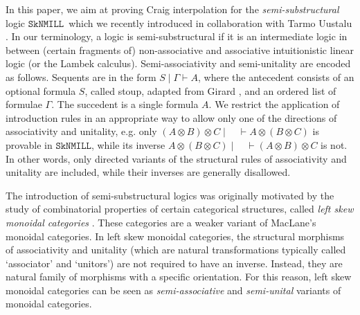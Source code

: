 \documentclass[sn-mathphys-num]{sn-jnl}%
\newcommand{\GG}{\Gamma}
\newcommand{\vd}{\vdash}
\newcommand{\ot}{\otimes}
\newcommand{\SkNMILL}{$\mathtt{SkNMILL}$}
\theoremstyle{thmstyleone}%
\theoremstyle{thmstyletwo}%
\theoremstyle{thmstylethree}%
\begin{document}
In this paper, we aim at proving Craig interpolation for the \emph{semi-substructural} logic \SkNMILL\ which we recently introduced in collaboration with Tarmo Uustalu \cite{UVW:protsn}.
In our terminology, a logic is semi-substructural if it is an intermediate logic in between (certain fragments of) non-associative and associative intuitionistic linear logic (or the Lambek calculus).
Semi-associativity and semi-unitality are encoded as follows.
Sequents are in the form $S \mid \GG \vdash A$, where the antecedent consists of an optional formula $S$, called stoup, adapted from Girard \cite{girard:constructive:91}, and an ordered list of formulae $\GG$.
The succedent is a single formula $A$.
We restrict the application of introduction rules in an appropriate way to allow only one of the directions of associativity and unitality, e.g. only $(A \ot B)\ot C \mid \quad \vd A \ot (B \ot C)$ is provable in \SkNMILL, while its inverse $A \ot (B \ot C) \mid \quad \vd (A \ot B) \ot C$ is not.
In other words, only directed variants of the structural rules of associativity and unitality are included, while their inverses are generally disallowed.

The introduction of semi-substructural logics was originally motivated by the study of combinatorial properties of certain categorical structures, called \emph{left skew monoidal categories} \cite{szlachanyi:skew-monoidal:2012}.
These categories are a weaker variant of MacLane's monoidal categories.
In left skew monoidal categories, the structural morphisms of associativity and unitality (which are natural transformations typically called `associator' and `unitors') are not required to have an inverse. Instead, they are natural family of morphisms with a specific orientation.
For this reason, left skew monoidal categories can be seen as \emph{semi-associative} and \emph{semi-unital} variants of monoidal categories. 
\end{document}
